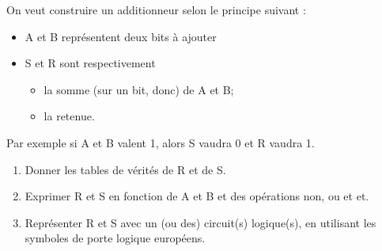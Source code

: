\begin{exercice}[]
    On veut construire un \og additionneur\fg{} selon le principe suivant :
    \begin{itemize}
        \item 	A et B représentent deux bits à ajouter
        \item 	S et R sont respectivement
              \begin{itemize}
                  \item 	la somme (sur un bit, donc) de A et B;
                  \item 	la retenue.
              \end{itemize}
    \end{itemize}
    Par exemple si A et B valent 1, alors S vaudra 0 et R vaudra 1.
    \begin{enumerate}
        \item 	Donner les tables de vérités de R et de S.
        \item 	Exprimer R et S en fonction de A et B et des opérations \og non\fg{}, \og ou\fg{} et \og et\fg{}.
        \item 	Représenter R et S avec un (ou des) circuit(s) logique(s), en utilisant les symboles de porte logique européens.
    \end{enumerate}
\end{exercice}

